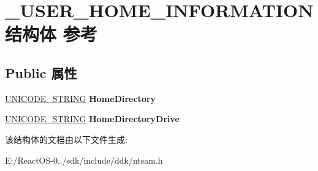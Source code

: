\hypertarget{struct___u_s_e_r___h_o_m_e___i_n_f_o_r_m_a_t_i_o_n}{}\section{\+\_\+\+U\+S\+E\+R\+\_\+\+H\+O\+M\+E\+\_\+\+I\+N\+F\+O\+R\+M\+A\+T\+I\+O\+N结构体 参考}
\label{struct___u_s_e_r___h_o_m_e___i_n_f_o_r_m_a_t_i_o_n}
\subsection*{Public 属性}
\begin{DoxyCompactItemize}
\item 
\mbox{\label{struct___u_s_e_r___h_o_m_e___i_n_f_o_r_m_a_t_i_o_n_ae45843e1cac6f047e2f7f62ca54639f5}} 
\hyperlink{struct___u_n_i_c_o_d_e___s_t_r_i_n_g}{U\+N\+I\+C\+O\+D\+E\+\_\+\+S\+T\+R\+I\+NG} {\bfseries Home\+Directory}
\item 
\mbox{\label{struct___u_s_e_r___h_o_m_e___i_n_f_o_r_m_a_t_i_o_n_a969557ace9c339c3c28591598cdebce4}} 
\hyperlink{struct___u_n_i_c_o_d_e___s_t_r_i_n_g}{U\+N\+I\+C\+O\+D\+E\+\_\+\+S\+T\+R\+I\+NG} {\bfseries Home\+Directory\+Drive}
\end{DoxyCompactItemize}


该结构体的文档由以下文件生成\+:\begin{DoxyCompactItemize}
\item 
E\+:/\+React\+O\+S-\/0../sdk/include/ddk/ntsam.\+h\end{DoxyCompactItemize}
